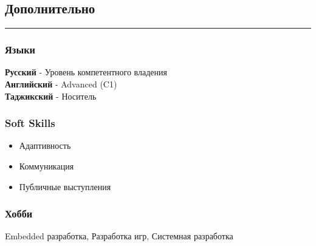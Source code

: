 \documentclass[a4paper,10pt]{article}
\begin{document}
\subsection*{Дополнительно}
\hrule
\vspace*{5mm}
\subsubsection*{Языки}
\textbf{Русский} - Уровень компетентного владения \\
\textbf{Английский} - Advanced (C1) \\
\textbf{Таджикский} - Носитель
\subsubsection*{Soft Skills}
\begin{itemize}
    \item Адаптивность
    \item Коммуникация
    \item Публичные выступления
\end{itemize}
\subsubsection*{Хобби}
Embedded разработка, Разработка игр, Системная разработка
\end{document}
